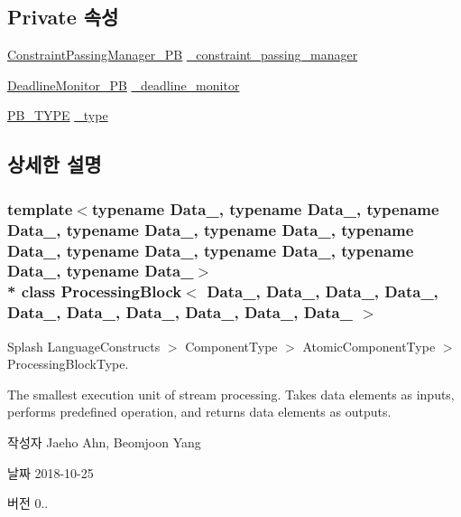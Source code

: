 \subsection*{Private 속성}
\begin{DoxyCompactItemize}
\item 
\hyperlink{classConstraintPassingManager__PB}{Constraint\+Passing\+Manager\+\_\+\+PB} \hyperlink{classProcessingBlock_a5dd352289efbd6a8e930033c4f705586}{\+\_\+constraint\+\_\+passing\+\_\+manager}
\item 
\hyperlink{classDeadlineMonitor__PB}{Deadline\+Monitor\+\_\+\+PB} \hyperlink{classProcessingBlock_a33a0fcb9837f2b6920fc3ddd320906f0}{\+\_\+deadline\+\_\+monitor}
\item 
\hyperlink{classProcessingBlock_a7101250aa8b5a80fb331ea50ddabda01}{P\+B\+\_\+\+T\+Y\+PE} \hyperlink{classProcessingBlock_a8e6d7304fe7a12682a5ca144e942d632}{\+\_\+type}
\end{DoxyCompactItemize}


\subsection{상세한 설명}
\subsubsection*{template$<$typename Data\+\_, typename Data\+\_, typename Data\+\_, typename Data\+\_, typename Data\+\_, typename Data\+\_, typename Data\+\_, typename Data\+\_, typename Data\+\_, typename Data\+\_$>$\\*
class Processing\+Block$<$ Data\+\_, Data\+\_, Data\+\_, Data\+\_, Data\+\_, Data\+\_, Data\+\_, Data\+\_, Data\+\_, Data\+\_ $>$}

Splash Language\+Constructs $>$ Component\+Type $>$ Atomic\+Component\+Type $>$ Processing\+Block\+Type. 

The smallest execution unit of stream processing. Takes data elements as inputs, performs predefined operation, and returns data elements as outputs. \begin{DoxyAuthor}{작성자}
Jaeho Ahn, Beomjoon Yang 
\end{DoxyAuthor}
\begin{DoxyDate}{날짜}
2018-\/10-\/25 
\end{DoxyDate}
\begin{DoxyVersion}{버전}
0.. 
\end{DoxyVersion}


